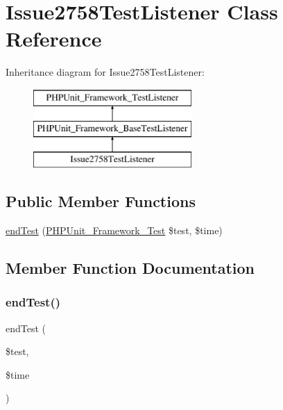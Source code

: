 \hypertarget{class_issue2758_test_listener}{}\section{Issue2758\+Test\+Listener Class Reference}
\label{class_issue2758_test_listener}
Inheritance diagram for Issue2758\+Test\+Listener\+:\begin{figure}[H]
\begin{center}
\leavevmode
\includegraphics[height=3.000000cm]{class_issue2758_test_listener}
\end{center}
\end{figure}
\subsection*{Public Member Functions}
\begin{DoxyCompactItemize}
\item 
\mbox{\hyperlink{class_issue2758_test_listener_a6de65eea8b294795cbc34c4c8cee8546}{end\+Test}} (\mbox{\hyperlink{interface_p_h_p_unit___framework___test}{P\+H\+P\+Unit\+\_\+\+Framework\+\_\+\+Test}} \$test, \$time)
\end{DoxyCompactItemize}


\subsection{Member Function Documentation}
\mbox{\label{class_issue2758_test_listener_a6de65eea8b294795cbc34c4c8cee8546}} 
\subsubsection{\texorpdfstring{end\+Test()}{endTest()}}
{\footnotesize\ttfamily end\+Test (\begin{DoxyParamCaption}\item[{\mbox{\hyperlink{interface_p_h_p_unit___framework___test}{P\+H\+P\+Unit\+\_\+\+Framework\+\_\+\+Test}}}]{\$test,  }\item[{}]{\$time }\end{DoxyParamCaption})}

